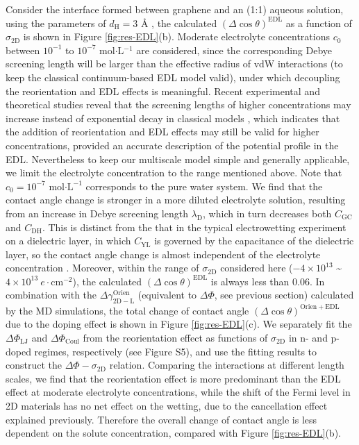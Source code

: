 Consider the interface formed between graphene and an (1:1) aqueous
solution, using the parameters of \(d_{\mathrm{H}}=3\) Å
\cite{mcclendon_thickness_1927},
the calculated \((\Delta \cos \theta)^{\mathrm{EDL}}\) as a function
of \(\sigma_{\mathrm{2D}}\) is shown in Figure \ref{fig:res-EDL}(b).
Moderate electrolyte concentrations \(c_{0}\) between \(10^{-1}\) to
\(10^{-7}\) mol\(\cdot\)L\(^{-1}\) are considered, since the corresponding Debye
screening length will be larger than the effective radius of vdW
interactions (to keep the classical continuum-based EDL model valid), under which decoupling the reorientation and EDL effects is
meaningful. Recent experimental and theoretical studies reveal that
the screening lengths of higher concentrations may increase instead of
exponential decay in classical models
\cite{Smith_2016_screening_length,Lee_2017_screening_length}, which
indicates that the addition of reorientation and EDL effects may still be
valid for higher concentrations, provided an accurate description of
the potential profile in the EDL. Nevertheless to keep our multiscale
model simple and generally applicable, we limit the electrolyte
concentration to the range mentioned above. Note that
\(c_{0}=10^{-7}\) mol\(\cdot \mathrm{L}^{-1}\) corresponds to the pure
water system. We find that the contact angle change is stronger in a
more diluted electrolyte solution, resulting from an increase in Debye
screening length \(\lambda_{\mathrm{D}}\), which in turn decreases
both \(C_{\mathrm{GC}}\) and \(C_{\mathrm{DH}}\). This is distinct
from the that in the typical electrowetting experiment on a dielectric
layer, in which \(C_{\mathrm{YL}}\) is governed by the capacitance of
the dielectric layer, so the contact angle change is almost
independent of the electrolyte concentration
\cite{Mugele_2005}. Moreover, within the range of
\(\sigma_{\mathrm{2D}}\) considered here (\(-4\times10^{13}\)
\textasciitilde{} \(4\times10^{13}\ e\cdot \mathrm{cm}^{-2}\)), the
calculated \((\Delta \cos \theta)^{\mathrm{EDL}}\) is always less than
0.06.  In combination with the
\(\Delta \gamma^{\mathrm{Orien}}_{\mathrm{2D-L}}\) (equivalent to
\(\Delta \Phi\), see previous section) calculated by the MD
simulations, the total change of contact angle
\((\Delta \cos \theta)^{\mathrm{Orien + EDL}}\) due to the doping
effect is shown in Figure \ref{fig:res-EDL}(c). We separately fit the
\(\Delta \Phi_{\mathrm{LJ}}\) and \(\Delta \Phi_{\mathrm{Coul}}\) from
the reorientation effect as functions of \(\sigma_{\mathrm{2D}}\) in
n- and p-doped regimes, respectively (see Figure S5), and use the
fitting results to construct the \(\Delta \Phi-\sigma_{\mathrm{2D}}\)
relation. Comparing the interactions at different length scales, we
find that the reorientation effect is more predominant than the EDL
effect at moderate electrolyte concentrations, while the shift of the
Fermi level in 2D materials has no net effect on the wetting, due to the
cancellation effect explained previously. Therefore the overall change
of contact angle is less dependent on the solute concentration,
compared with Figure \ref{fig:res-EDL}(b).

